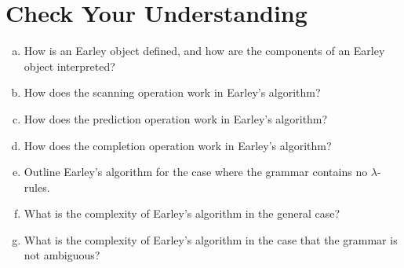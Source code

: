 \section{Check Your Understanding}
\begin{enumerate}[(a)]
\item How is an Earley object defined, and how are the components of an Earley object interpreted?
\item How does the scanning operation work in Earley's algorithm?
\item How does the prediction operation work in Earley's algorithm?
\item How does the completion operation work in Earley's algorithm?
\item Outline Earley's algorithm for the case where the grammar contains no $\lambda$-rules.
\item What is the complexity of Earley's algorithm in the general case?
\item What is the complexity of Earley's algorithm in the case that the grammar is not ambiguous?
\end{enumerate}



